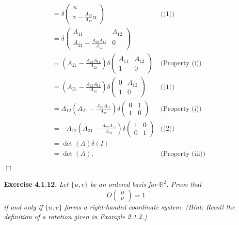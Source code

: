 \documentclass{article}
\begin{document}
\begin{enumerate}
\begin{align*}
&= \delta\begin{pmatrix} u \\ v - \frac{A_{22}}{A_{12}} u \end{pmatrix}
  &\text{((1))} \\
&= \delta\begin{pmatrix}
    A_{11} & A_{12} \\
    A_{21}-\frac{A_{22}A_{11}}{A_{12}} & 0
  \end{pmatrix} \\
&= \left( A_{21}-\frac{A_{22}A_{11}}{A_{12}} \right)
  \delta\begin{pmatrix}
    A_{11} & A_{12} \\
    1 & 0
  \end{pmatrix}
  &\text{(Property (i))} \\
&= \left( A_{21}-\frac{A_{22}A_{11}}{A_{12}} \right)
  \delta\begin{pmatrix}
    0 & A_{12} \\
    1 & 0
  \end{pmatrix}
  &\text{((1))} \\
&= A_{12}\left( A_{21}-\frac{A_{22}A_{11}}{A_{12}} \right)
  \delta\begin{pmatrix}
    0 & 1 \\
    1 & 0
  \end{pmatrix}
  &\text{(Property (i))} \\
&= -A_{12}\left( A_{21}-\frac{A_{22}A_{11}}{A_{12}} \right)
  \delta\begin{pmatrix}
    1 & 0 \\
    0 & 1
  \end{pmatrix}
  &\text{((2))} \\
&= \det(A)\delta(I) \\
&= \det(A).
  &\text{(Property (iii))}
\end{align*}


\end{enumerate}
$\Box$ \\\\






\textbf{Exercise 4.1.12.}
\emph{Let $\{ u, v \}$ be an ordered basis for $\mathbb{R}^2$.
Prove that
$$O\begin{pmatrix} u \\ v \end{pmatrix} = 1$$
if and only if $\{ u, v \}$ forms a right-handed coordinate system.
(Hint: Recall the definition of a rotation given in Example 2.1.2.)} \\
\end{document}
